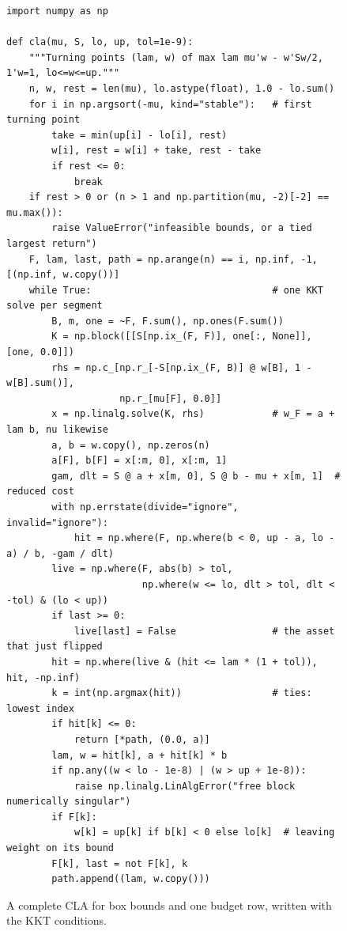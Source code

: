 \documentclass[11pt,a4paper]{article}
\begin{document}
\begin{figure}[ht]
\begin{lstlisting}[style=py,basicstyle=\ttfamily\footnotesize]
import numpy as np

def cla(mu, S, lo, up, tol=1e-9):
    """Turning points (lam, w) of max lam mu'w - w'Sw/2, 1'w=1, lo<=w<=up."""
    n, w, rest = len(mu), lo.astype(float), 1.0 - lo.sum()
    for i in np.argsort(-mu, kind="stable"):   # first turning point
        take = min(up[i] - lo[i], rest)
        w[i], rest = w[i] + take, rest - take
        if rest <= 0:
            break
    if rest > 0 or (n > 1 and np.partition(mu, -2)[-2] == mu.max()):
        raise ValueError("infeasible bounds, or a tied largest return")
    F, lam, last, path = np.arange(n) == i, np.inf, -1, [(np.inf, w.copy())]
    while True:                                # one KKT solve per segment
        B, m, one = ~F, F.sum(), np.ones(F.sum())
        K = np.block([[S[np.ix_(F, F)], one[:, None]], [one, 0.0]])
        rhs = np.c_[np.r_[-S[np.ix_(F, B)] @ w[B], 1 - w[B].sum()],
                    np.r_[mu[F], 0.0]]
        x = np.linalg.solve(K, rhs)            # w_F = a + lam b, nu likewise
        a, b = w.copy(), np.zeros(n)
        a[F], b[F] = x[:m, 0], x[:m, 1]
        gam, dlt = S @ a + x[m, 0], S @ b - mu + x[m, 1]  # reduced cost
        with np.errstate(divide="ignore", invalid="ignore"):
            hit = np.where(F, np.where(b < 0, up - a, lo - a) / b, -gam / dlt)
        live = np.where(F, abs(b) > tol,
                        np.where(w <= lo, dlt > tol, dlt < -tol) & (lo < up))
        if last >= 0:
            live[last] = False                 # the asset that just flipped
        hit = np.where(live & (hit <= lam * (1 + tol)), hit, -np.inf)
        k = int(np.argmax(hit))                # ties: lowest index
        if hit[k] <= 0:
            return [*path, (0.0, a)]
        lam, w = hit[k], a + hit[k] * b
        if np.any((w < lo - 1e-8) | (w > up + 1e-8)):
            raise np.linalg.LinAlgError("free block numerically singular")
        if F[k]:
            w[k] = up[k] if b[k] < 0 else lo[k]  # leaving weight on its bound
        F[k], last = not F[k], k
        path.append((lam, w.copy()))
\end{lstlisting}
\caption{A complete CLA for box bounds and one budget row, written with the
  KKT conditions.}\label{lst:kktcla}
\end{figure}
\end{document}
